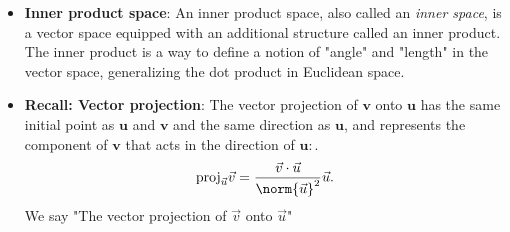 \documentclass{report}
\begin{document}
\begin{itemize}
        \item \textbf{Inner product space}: An inner product space, also called an \textit{inner space}, is a vector space equipped with an additional structure called an inner product. The inner product is a way to define a notion of "angle" and "length" in the vector space, generalizing the dot product in Euclidean space.
        \item \textbf{Recall: Vector projection}: The vector projection of $\mathbf{v}$ onto $\mathbf{u}$ has the same initial point as $\mathbf{u}$ and $\mathbf{v}$ and the same direction as $\mathbf{u}$, and represents the component of $\mathbf{v}$ that acts in the direction of $\mathbf{u}:$.
                \begin{align*}
                    \text{proj}_{\vec{u}}\vec{v} = \frac{\vec{v} \cdot \vec{u}}{\norm{\vec{u}}^{2}}\vec{u}
                .\end{align*}
                We say "The vector projection of $\vec{v}$ onto $\vec{u}$"






    \end{itemize}

    \pagebreak 
\end{document}
